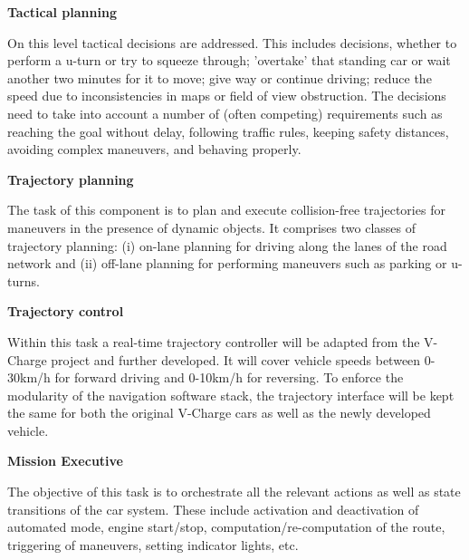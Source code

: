 {\begin{tasks}{\WPNavigationNo}
\item  {\bf Tactical planning}
  \taskpartner{\VW}
  \label{task:wpnav:tact}

On this level tactical decisions are addressed. This includes decisions, whether to perform a u-turn or try to squeeze through; 'overtake' that standing car or wait another two minutes for it to move; give way or continue driving; reduce the speed due to inconsistencies in maps or field of view obstruction. The decisions need to take into account a number of (often competing) requirements such as reaching the goal without delay, following traffic rules, keeping safety distances, avoiding complex maneuvers, and behaving properly.


\item  {\bf Trajectory planning}
  \taskpartner{\VW}
  \label{task:wpnav:trajectory}

The task of this component is to plan and execute collision-free trajectories for maneuvers in the presence of dynamic objects. It comprises two classes of trajectory planning: (i) on-lane planning for driving along the lanes of the road network and (ii) off-lane planning for performing maneuvers such as parking or u-turns.


\item {\bf Trajectory control}
	\taskpartner{\VW}
	\label{task:wpnav:control}
	
Within this task a real-time trajectory controller will be adapted from the V-Charge project and further developed. It will cover vehicle speeds between 0-30km/h for forward driving and 0-10km/h for reversing. To enforce the modularity of the navigation software stack, the trajectory interface will be kept the same for both the original V-Charge cars as well as the newly developed vehicle. 

\item  {\bf Mission Executive}
  \taskpartner{\VW}
  \label{task:wpnav:mission}

The objective of this task is to orchestrate all the relevant actions as well as state transitions of the car system. These include activation and deactivation of automated mode, engine start/stop, computation/re-computation of the route, triggering of maneuvers, setting indicator lights, etc.




\end{tasks}}
